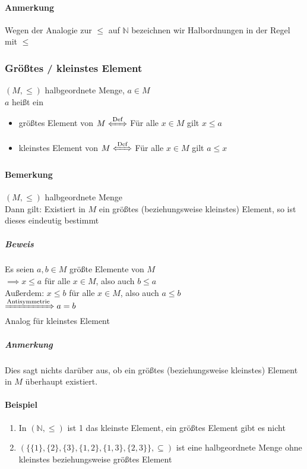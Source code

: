 \documentclass[a4paper]{scrartcl}
\theoremstyle{definition}
\theoremstyle{plain}
\theoremstyle{plain}
\theoremstyle{remark}
\theoremstyle{remark}
\theoremstyle{remark}
\theoremstyle{remark}
\theoremstyle{remark}
\begin{document}
\paragraph{Anmerkung}
\label{sec-2-5-3-2}
Wegen der Analogie zur $\leq$ auf $\mathbb{N}$ bezeichnen wir Halbordnungen in der Regel mit $\leq$
\subsubsection{Größtes / kleinstes Element}
\label{sec-2-5-4}
$(M, \leq)$ halbgeordnete Menge, $a\in M$ \\
        $a$ heißt ein
\begin{itemize}
\item größtes Element von $M\xLeftrightarrow{\text{Def}}$ Für alle $x\in M$ gilt $x\leq a$
\item kleinstes Element von $M\xLeftrightarrow{\text{Def}}$ Für alle $x\in M$ gilt $a\leq x$
\end{itemize}
\paragraph{Bemerkung}
\label{sec-2-5-4-1}
$(M,\leq)$ halbgeordnete Menge \\
         Dann gilt: Existiert in $M$ ein größtes (beziehungsweise kleinstes) Element, so ist dieses eindeutig bestimmt
\subparagraph{Beweis}
\label{sec-2-5-4-1-1}
Es seien $a,b\in M$ größte Elemente von $M$ \\
          $\implies x\leq a$ für alle $x\in M$, also auch $b\leq a$ \\
          Außerdem: $x \leq b$ für alle $x\in M$, also auch $a\leq b$ \\
          $\xRightarrow{\text{Antisymmetrie}} a = b$ \\
          Analog für kleinstes Element
\subparagraph{Anmerkung}
\label{sec-2-5-4-1-2}
Dies sagt nichts darüber aus, ob ein größtes (beziehungsweise kleinstes) Element in $M$ überhaupt existiert.
\paragraph{Beispiel}
\label{sec-2-5-4-2}
\begin{enumerate}
\item In $(\mathbb{N},\leq)$ ist 1 das kleinste Element, ein größtes Element gibt es nicht
\item $(\{\{1\},\{2\},\{3\},\{1,2\},\{1,3\},\{2,3\}\}, \subseteq)$ ist eine halbgeordnete Menge ohne kleinstes beziehungsweise größtes Element
\end{enumerate}
\end{document}
